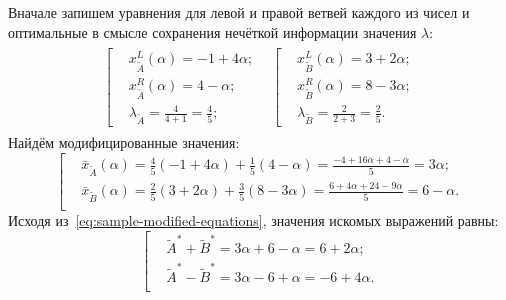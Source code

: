 Вначале запишем уравнения для левой и правой ветвей каждого из чисел и оптимальные в смысле сохранения нечёткой информации значения $\lambda $:
\begin{gather*}
\begin{matrix}
  \left[ \begin{aligned}
    & x_{\tilde A}^{L}\left( \alpha  \right)=-1+4\alpha;  \\ 
    & x_{\tilde A}^{R}\left( \alpha  \right)=4-\alpha;  \\ 
    & \lambda_{\tilde A}=\frac{4}{4+1}=\frac{4}{5};
  \end{aligned} \right.
  &
  \left[ \begin{aligned}
    & x_{\tilde B}^{L}\left( \alpha  \right)=3+2\alpha;  \\ 
    & x_{\tilde B}^{R}\left( \alpha  \right)=8-3\alpha;  \\ 
    & \lambda_{\tilde B}=\frac{2}{2+3}=\frac{2}{5}.
\end{aligned} \right.
\end{matrix}
\end{gather*}
Найдём модифицированные значения:
\begin{equation}
\label{eq:sample-modified-equations}
  \left[ \begin{aligned}
    & \bar{x}_{\tilde A}\left( \alpha  \right)=\frac{4}{5}\left( -1+4\alpha  \right)+\frac{1}{5}\left( 4-\alpha  \right)=\frac{-4+16\alpha +4-\alpha }{5}=3\alpha;  \\ 
    & \bar{x}_{\tilde B}\left( \alpha  \right)=\frac{2}{5}\left( 3+2\alpha  \right)+\frac{3}{5}\left( 8-3\alpha  \right)=\frac{6+4\alpha +24-9\alpha }{5}=6-\alpha.  \\ 
  \end{aligned} \right.
\end{equation}
Исходя из~\eqref{eq:sample-modified-equations}, значения искомых выражений равны:
\begin{equation*}
  \left[ \begin{aligned}
    & \tilde A^{*}+ \tilde B^{*}=3\alpha +6-\alpha =6+2\alpha; \\ 
    & \tilde A^{*}-\tilde B^{*}=3\alpha -6+\alpha =-6+4\alpha. \\ 
  \end{aligned} \right. 
\end{equation*}

